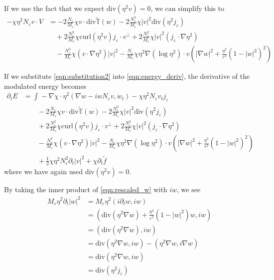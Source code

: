 \documentclass[a4paper]{article}
\newcommand{\curl}{\mathrm{curl}}
\renewcommand{\div}{\mathrm{div}}
\begin{document}
If we use the fact that we expect $\div ( \eta^2 v ) = 0$, we can simplify this to
\begin{align}
  - \chi \eta^2 N_\varepsilon v \cdot V &= -2 \frac{N_\varepsilon}{M_\varepsilon} \chi v \cdot \div \tilde{\mathbb{T}}(w) - 2
  \frac{N_\varepsilon^2}{M_\varepsilon} \chi |v|^2 \div ( \eta^2 j_\varepsilon ) \nonumber \\
  &\quad + 2 \frac{N_\varepsilon^2}{M_\varepsilon} \chi \curl(\eta^2 v) j_\varepsilon \cdot v^\perp + 2 \frac{N_\varepsilon^2}{M_\varepsilon} \chi
  |v|^2 (j_\varepsilon \cdot \nabla \eta^2) \nonumber \\
  &\quad - \frac{N_\varepsilon^3}{M_\varepsilon} \chi (v \cdot \nabla \eta^2) |v|^2 - \frac{N_\varepsilon}{M_\varepsilon} \chi \eta^2 \nabla( \log \eta^2 ) \cdot v \left( | \nabla w |^2 + \frac{\eta^2}{\varepsilon^2} (1-|w|^2)^2 \right)
  \label{eqn:substitution2}
\end{align}

If we substitute \eqref{eqn:substitution2} into \eqref{eqn:energy_deriv}, the derivative of the modulated energy becomes
\begin{align}
  \partial_t E &= \int_{}^{} -\nabla \chi \cdot \eta^2 ( \nabla w - i w N_\varepsilon v, w_t) - \chi \eta^2 N_\varepsilon v_t j_\varepsilon \nonumber
  \\
  &\quad \quad -2 \frac{N_\varepsilon}{M_\varepsilon} \chi v \cdot \div \tilde{\mathbb{T}}(w) - 2
  \frac{N_\varepsilon^2}{M_\varepsilon} \chi |v|^2 \div ( \eta^2 j_\varepsilon ) \nonumber \\
  &\quad \quad+ 2 \frac{N_\varepsilon^2}{M_\varepsilon} \chi \curl(\eta^2 v) j_\varepsilon \cdot v^\perp + 2 \frac{N_\varepsilon^2}{M_\varepsilon} \chi
  |v|^2 (j_\varepsilon \cdot \nabla \eta^2) \nonumber \\
  &\quad \quad - \frac{N_\varepsilon^3}{M_\varepsilon} \chi (v \cdot \nabla \eta^2) |v|^2 - \frac{N_\varepsilon}{M_\varepsilon} \chi \eta^2 \nabla(
  \log \eta^2 ) \cdot v \left( | \nabla w |^2 + \frac{\eta^2}{\varepsilon^2} (1-|w|^2)^2 \right) \nonumber \\
  &\quad \quad + \frac{1}{2} \chi \eta^2 N_\varepsilon^2 \partial_t |v|^2 + \chi \partial_t \tilde{f}
  \label{eqn:deriv_energy}
\end{align}
where we have again used $\div(\eta^2 v) = 0$.

By taking the inner product of \eqref{eqn:rescaled_w} with $iw$, we see
\begin{align}
  M_\varepsilon \eta^2 \partial_t |w|^2 &= M_\varepsilon \eta^2 (i \partial_t w, iw) \nonumber \\
  &= ( \div ( \eta^2 \nabla w ) + \frac{\eta^4}{\varepsilon^2} (1-|w|^2)w, iw) \nonumber \\
  &= ( \div ( \eta^2 \nabla w ), iw ) \nonumber \\
  &= \div (\eta^2 \nabla w, iw) - ( \eta^2 \nabla w, i \nabla w ) \nonumber \\
  &= \div (\eta^2 \nabla w, iw) \nonumber \\
  &= \div (\eta^2 j_\varepsilon)
  \label{eqn:div_eta^2j}
\end{align}
\end{document}
